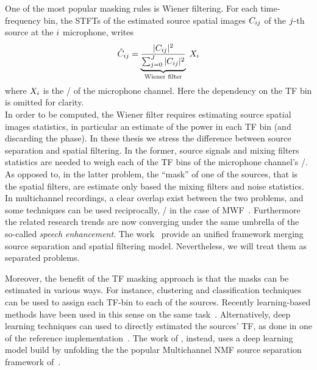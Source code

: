 One of the most popular masking rules is Wiener filtering.
For each time-frequency bin, the \acp{STFT} of the estimated source spatial images $C_{ij}$ of the $j$-th source at the $i$ microphone, writes
\begin{equation}
        \hat{C}_{ij} = \underbrace{\frac{|{C_{ij}}|^2}
                                        {\sum_{j=0}^{J} |{C_{ij}}|^2}}
                                        _{\text{Wiener filter}} \; X_{i}
\end{equation}
where $X_{i}$ is the \STFT/ of the microphone channel.
Here the dependency on the \ac{TF} bin is omitted for clarity.
\\In order to be computed, the Wiener filter requires estimating source spatial images statistics, in particular an estimate of the power in each \ac{TF} bin (and discarding the phase).
In these thesis we stress the difference between source separation and spatial filtering.
In the former, source signals and mixing filters statistics are needed to weigh each of the \ac{TF} bins of the microphone channel's \STFT/.
As opposed to, in the latter problem, the ``mask'' of one of the sources, that is the spatial filters, are estimate only based the mixing filters and noise statistics.
\\In multichannel recordings, a clear overlap exist between the two problems, and some techniques can be used reciprocally, \eg/ in the case of \ac{MWF}~.
Furthermore the related research trends are now converging under the same umbrella of the so-called \textit{speech enhancement}.
The work~ provide an unified framework merging source separation and spatial filtering model.
Nevertheless, we will treat them as separated problems.

\mynewline
Moreover, the benefit of the \ac{TF} masking approach is that the masks can be estimated in various ways.
For instance, clustering and classification techniques~ can be used to assign each \ac{TF}-bin to each of the sources.
Recently learning-based methods have been used in this sense on the same task~.
Alternatively, deep learning techniques can used to directly estimated the sources' \ac{TF}, as done in one of the reference implementation~.
The work of , instead, uses a deep learning model build by unfolding the the popular Multichannel \ac{NMF} source separation framework of~.

